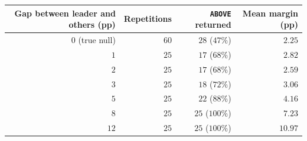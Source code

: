 \begin{tabular}{rrrr}
\toprule
Gap between leader and others (pp) & Repetitions & \texttt{ABOVE} returned & Mean margin (pp) \\
\midrule
$0$ (true null)  & $60$ & $28$ \;($47\%$) & $2.25$ \\
$1$              & $25$ & $17$ \;($68\%$) & $2.82$ \\
$2$              & $25$ & $17$ \;($68\%$) & $2.59$ \\
$3$              & $25$ & $18$ \;($72\%$) & $3.06$ \\
$5$              & $25$ & $22$ \;($88\%$) & $4.16$ \\
$8$              & $25$ & $25$ \;($100\%$) & $7.23$ \\
$12$             & $25$ & $25$ \;($100\%$) & $10.97$ \\
\bottomrule
\end{tabular}
